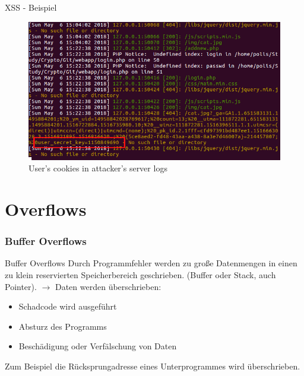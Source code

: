 \documentclass[10pt]{beamer}
\begin{document}
\begin{frame}[fragile]{XSS - Beispiel}
  \begin{figure}[ht]
      \centering
      \includegraphics[width=\textwidth]{XSS-3.png}
      \caption{User's cookies in attacker's server logs}
      \label{fig:figure3}
  \end{figure}
\end{frame}


\section{Overflows}

\subsubsection{Buffer Overflows}

\begin{frame}[fragile]{Buffer Overflows}
  Durch Programmfehler werden zu gro{\ss}e Datenmengen in einen zu klein reservierten Speicherbereich geschrieben.
  (Buffer oder Stack, auch Pointer).
  \newline
  \newline
  $\rightarrow$ Daten werden \"uberschrieben:
  \begin{itemize}
    \item Schadcode wird ausgef\"uhrt
    \item Absturz des Programms
    \item Besch\"adigung oder Verf\"alschung von Daten
  \end{itemize}
  Zum Beispiel die R\"ucksprungadresse eines Unterprogrammes wird \"uberschrieben.
\end{frame}
\end{document}
